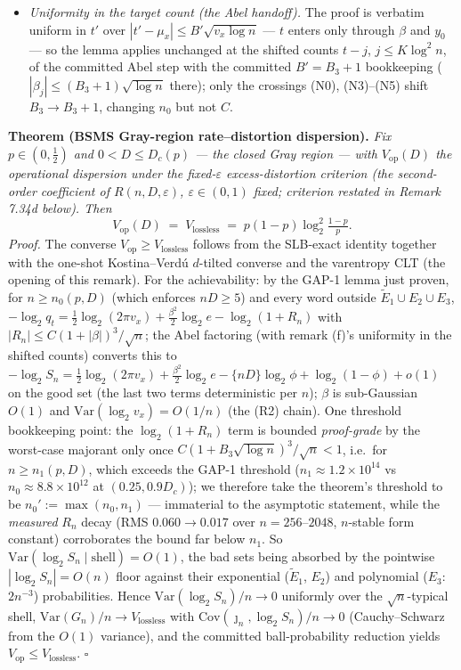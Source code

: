\documentclass[
]{article}
\begin{document}
\begin{itemize}
write-out itself: (E2)'s exact cancellation, the (E5) weighted-cubic
bound, the (E8) favorable-sign vertical bound, and the (E9) dyadic-net
quenched quadratic domination with explicit Jordan constants.
\item[(f)] \emph{Uniformity in the target count (the Abel handoff).}
The proof is verbatim uniform in $t'$ over $|t'-\mu_x|\le
B'\sqrt{v_x\log n}$ --- $t$ enters only through $\beta$ and $y_0$ ---
so the lemma applies unchanged at the shifted counts $t-j$,
$j\le K\log^2n$, of the committed Abel step with the committed
$B'=B_3+1$ bookkeeping ($|\beta_j|\le(B_3+1)\sqrt{\log n}$ there);
only the crossings (N0), (N3)--(N5) shift $B_3\to B_3+1$, changing
$n_0$ but not $C$.
\end{itemize}

\textbf{Theorem (BSMS Gray-region rate--distortion dispersion).} \emph{Fix $p\in(0,\tfrac12)$ and
$0<D\le D_c(p)$ --- the closed Gray region --- with $V_{\mathrm{op}}(D)$ the operational dispersion
under the fixed-$\varepsilon$
excess-distortion criterion (the second-order coefficient of $R(n,D,\varepsilon)$,
$\varepsilon\in(0,1)$ fixed; criterion restated in Remark 7.34d below). Then}
\[
  V_{\mathrm{op}}(D)\;=\;V_{\mathrm{lossless}}\;=\;p(1-p)\log_2^2\tfrac{1-p}p .
\]
\emph{Proof.} The converse $V_{\mathrm{op}}\ge V_{\mathrm{lossless}}$ follows from the SLB-exact
identity together with the one-shot Kostina--Verd\'u $d$-tilted converse and the varentropy CLT (the
opening of this remark). For the
achievability: by the GAP-1 lemma just proven, for $n\ge n_0(p,D)$ (which enforces $nD\ge5$) and every
word outside
$\widetilde E_1\cup E_2\cup E_3$, $-\log_2 q_t=\tfrac12\log_2(2\pi v_x)+\tfrac{\beta^2}{2}\log_2e
-\log_2(1+R_n)$ with $|R_n|\le C(1+|\beta|)^3/\sqrt n$; the Abel factoring (with remark (f)'s
uniformity in the shifted counts) converts this to $-\log_2 S_n=\tfrac12\log_2(2\pi v_x)
+\tfrac{\beta^2}{2}\log_2e-\{nD\}\log_2\phi+\log_2(1-\phi)+o(1)$ on the good set (the last two terms
deterministic per $n$); $\beta$ is sub-Gaussian $O(1)$ and
$\mathrm{Var}(\log_2 v_x)=O(1/n)$ (the (R2) chain). One threshold bookkeeping point: the
$\log_2(1+R_n)$ term is bounded \emph{proof-grade} by the worst-case majorant only once
$C(1+B_3\sqrt{\log n})^3/\sqrt n<1$, i.e.\ for $n\ge n_1(p,D)$, which exceeds the GAP-1 threshold
($n_1\approx1.2\times10^{14}$ vs $n_0\approx8.8\times10^{12}$ at $(0.25,0.9D_c)$); we therefore take
the theorem's threshold to be $n_0':=\max(n_0,n_1)$ --- immaterial to the asymptotic statement, while
the \emph{measured} $R_n$ decay (RMS $0.060\to0.017$ over $n=256$--$2048$, $n$-stable form constant)
corroborates the bound far below $n_1$. So $\mathrm{Var}(\log_2 S_n\mid\text{shell})=O(1)$,
the bad sets being absorbed by the pointwise $|\log_2 S_n|=O(n)$ floor against their exponential
($\widetilde E_1$, $E_2$) and polynomial ($E_3$: $2n^{-3}$) probabilities. Hence
$\mathrm{Var}(\log_2 S_n)/n\to0$ uniformly over the
$\sqrt n$-typical shell, $\mathrm{Var}(G_n)/n\to V_{\mathrm{lossless}}$ with
$\mathrm{Cov}(\jmath_n,\log_2 S_n)/n\to0$ (Cauchy--Schwarz from the $O(1)$ variance), and the committed
ball-probability reduction yields $V_{\mathrm{op}}\le V_{\mathrm{lossless}}$. \hfill$\square$
\end{document}
